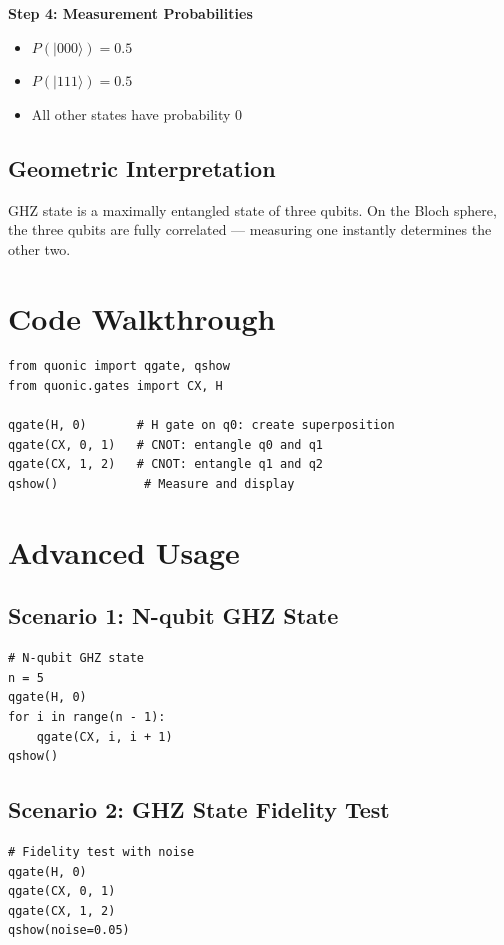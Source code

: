 \documentclass[12pt,a4paper]{article}
\begin{document}
\textbf{Step 4: Measurement Probabilities}

\begin{itemize}
  \item $P(|000\rangle) = 0.5$
  \item $P(|111\rangle) = 0.5$
  \item All other states have probability 0
\end{itemize}

\subsection{Geometric Interpretation}

GHZ state is a maximally entangled state of three qubits. On the Bloch sphere, the three qubits are fully correlated — measuring one instantly determines the other two.

\section{Code Walkthrough}

\begin{verbatim}
from quonic import qgate, qshow
from quonic.gates import CX, H

qgate(H, 0)       # H gate on q0: create superposition
qgate(CX, 0, 1)   # CNOT: entangle q0 and q1
qgate(CX, 1, 2)   # CNOT: entangle q1 and q2
qshow()            # Measure and display
\end{verbatim}

\section{Advanced Usage}

\subsection{Scenario 1: N-qubit GHZ State}

\begin{verbatim}
# N-qubit GHZ state
n = 5
qgate(H, 0)
for i in range(n - 1):
    qgate(CX, i, i + 1)
qshow()
\end{verbatim}

\subsection{Scenario 2: GHZ State Fidelity Test}

\begin{verbatim}
# Fidelity test with noise
qgate(H, 0)
qgate(CX, 0, 1)
qgate(CX, 1, 2)
qshow(noise=0.05)
\end{verbatim}
\end{document}
